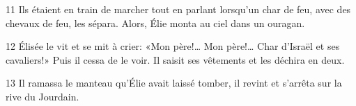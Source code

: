 
11 Ils étaient en train de marcher tout en parlant lorsqu’un char de feu, avec des chevaux de feu, les sépara. Alors, Élie monta au ciel dans un ouragan.

12 Élisée le vit et se mit à crier: «Mon père!… Mon père!… Char d’Israël et ses cavaliers!» Puis il cessa de le voir. Il saisit ses vêtements et les déchira en deux.

13 Il ramassa le manteau qu’Élie avait laissé tomber, il revint et s’arrêta sur la rive du Jourdain.
